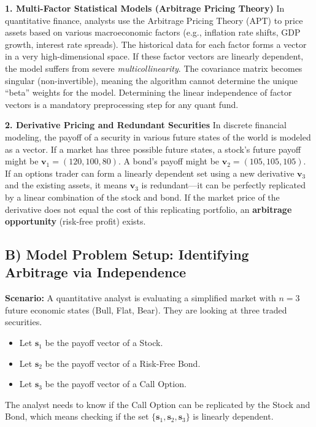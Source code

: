 \documentclass[11pt]{article}
\begin{document}
\textbf{1. Multi-Factor Statistical Models (Arbitrage Pricing Theory)}
In quantitative finance, analysts use the Arbitrage Pricing Theory (APT) to price assets based on various macroeconomic factors (e.g., inflation rate shifts, GDP growth, interest rate spreads). The historical data for each factor forms a vector in a very high-dimensional space. If these factor vectors are linearly dependent, the model suffers from severe \textit{multicollinearity}. The covariance matrix becomes singular (non-invertible), meaning the algorithm cannot determine the unique ``beta'' weights for the model. Determining the linear independence of factor vectors is a mandatory preprocessing step for any quant fund.

\textbf{2. Derivative Pricing and Redundant Securities}
In discrete financial modeling, the payoff of a security in various future states of the world is modeled as a vector. If a market has three possible future states, a stock's future payoff might be $\mathbf{v}_1 = (120, 100, 80)$. A bond's payoff might be $\mathbf{v}_2 = (105, 105, 105)$. If an options trader can form a linearly dependent set using a new derivative $\mathbf{v}_3$ and the existing assets, it means $\mathbf{v}_3$ is redundant---it can be perfectly replicated by a linear combination of the stock and bond. If the market price of the derivative does not equal the cost of this replicating portfolio, an \textbf{arbitrage opportunity} (risk-free profit) exists.

\subsection{B) Model Problem Setup: Identifying Arbitrage via Independence}

\textbf{Scenario:} A quantitative analyst is evaluating a simplified market with $n=3$ future economic states (Bull, Flat, Bear). They are looking at three traded securities. 
\begin{itemize}
    \item Let $\mathbf{s}_1$ be the payoff vector of a Stock.
    \item Let $\mathbf{s}_2$ be the payoff vector of a Risk-Free Bond.
    \item Let $\mathbf{s}_3$ be the payoff vector of a Call Option.
\end{itemize}
The analyst needs to know if the Call Option can be replicated by the Stock and Bond, which means checking if the set $\{\mathbf{s}_1, \mathbf{s}_2, \mathbf{s}_3\}$ is linearly dependent.
\end{document}
